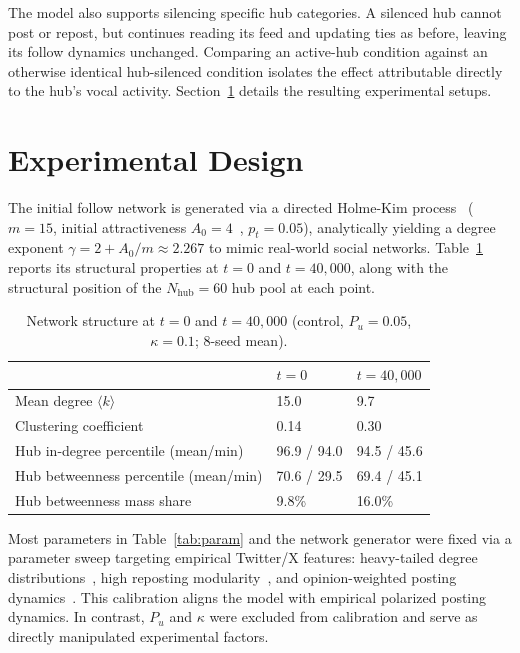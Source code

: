 \documentclass{svproc}
\def\VCR{\kappa}                 %
\begin{document}
The model also supports silencing specific hub categories. A silenced
hub cannot post or repost, but continues reading its feed and updating
ties as before, leaving its follow dynamics unchanged. Comparing an
active-hub condition against an otherwise identical hub-silenced
condition isolates the effect attributable directly to the hub's vocal
activity. Section~\ref{sec:experiments} details the resulting
experimental setups.
\par


\section{Experimental Design}\label{sec:experiments}
The initial follow network is generated via a directed Holme-Kim
process~\cite{holme2002} ($m=15$, initial attractiveness
$A_0=4$~\cite{dorogovtsev2000}, $p_t=0.05$), analytically yielding a
degree exponent $\gamma=2+A_0/m\approx2.267$ to mimic real-world
social networks. Table~\ref{tab:netstats} reports its structural
properties at $t=0$ and $t=40{,}000$, along with the structural
position of the $N_{\mathrm{hub}}=60$ hub pool at each point.
\par

\begin{table}[t]
\centering
\caption{Network structure at $t=0$ and $t=40{,}000$ (control,
$P_u=0.05$, $\VCR=0.1$; 8-seed mean).}\label{tab:netstats}
\tabcolsep=5pt
\begin{tabular}{lll}
\toprule
 & $t=0$ & $t=40{,}000$ \\
\midrule
Mean degree $\langle k\rangle$ & 15.0 & 9.7 \\
Clustering coefficient & 0.14 & 0.30 \\
Hub in-degree percentile (mean/min) & 96.9 / 94.0 & 94.5 / 45.6 \\
Hub betweenness percentile (mean/min) & 70.6 / 29.5 & 69.4 / 45.1 \\
Hub betweenness mass share & 9.8\% & 16.0\% \\
\bottomrule
\end{tabular}
\end{table}


Most parameters in Table~\ref{tab:param} and the network generator
were fixed via a parameter sweep targeting empirical Twitter/X
features: heavy-tailed degree distributions~\cite{kwak2010}, high
reposting modularity~\cite{conover2011}, and opinion-weighted posting
dynamics~\cite{buntain2025}. This calibration aligns the model with
empirical polarized posting dynamics. In contrast, $P_u$ and $\VCR$
were excluded from calibration and serve as directly manipulated
experimental factors.
\par
\end{document}
